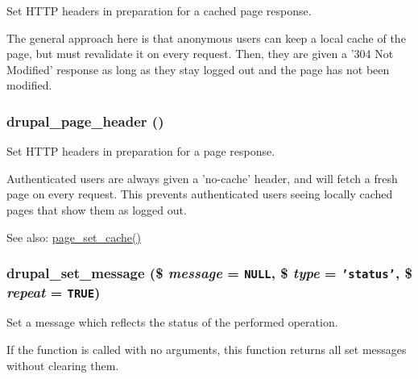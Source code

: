 Set HTTP headers in preparation for a cached page response.

The general approach here is that anonymous users can keep a local cache of the page, but must revalidate it on every request. Then, they are given a '304 Not Modified' response as long as they stay logged out and the page has not been modified. \hypertarget{bootstrap_8inc_05f3dc0377da7898b9cb53977c30cca6}{
\subsubsection[{drupal\_\-page\_\-header}]{\setlength{\rightskip}{0pt plus 5cm}drupal\_\-page\_\-header ()}}
\label{bootstrap_8inc_05f3dc0377da7898b9cb53977c30cca6}


Set HTTP headers in preparation for a page response.

Authenticated users are always given a 'no-cache' header, and will fetch a fresh page on every request. This prevents authenticated users seeing locally cached pages that show them as logged out.

\begin{Desc}
\item[See also:]\hyperlink{common_8inc_1e3b3fde2d48f8ef01d6ddd0a16fb073}{page\_\-set\_\-cache()} \end{Desc}
\hypertarget{bootstrap_8inc_d9223d86c7b08b1288274ce211d9bfa6}{
\subsubsection[{drupal\_\-set\_\-message}]{\setlength{\rightskip}{0pt plus 5cm}drupal\_\-set\_\-message (\$ {\em message} = {\tt NULL}, \/  \$ {\em type} = {\tt 'status'}, \/  \$ {\em repeat} = {\tt TRUE})}}
\label{bootstrap_8inc_d9223d86c7b08b1288274ce211d9bfa6}


Set a message which reflects the status of the performed operation.

If the function is called with no arguments, this function returns all set messages without clearing them.

